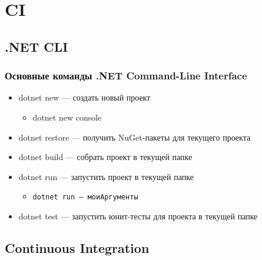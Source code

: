 \documentclass{../../slides-style}
\begin{document}
    \begin{frame}[plain]
        \titlepage
    \end{frame}

    \section{CI}

    \subsection{.NET CLI}

    \begin{frame}
        \frametitle{Основные команды .NET Command-Line Interface}
        \begin{itemize}
            \item dotnet new --- создать новый проект
            \begin{itemize}
                \item dotnet new console
            \end{itemize}
            \item dotnet restore --- получить NuGet-пакеты для текущего проекта
            \item dotnet build --- собрать проект в текущей папке
            \item dotnet run --- запустить проект в текущей папке
            \begin{itemize}
                \item \texttt{dotnet run -- моиАргументы}
            \end{itemize}
            \item dotnet test --- запустить юнит-тесты для проекта в текущей папке
        \end{itemize}
    \end{frame}

    \subsection{Continuous Integration}
\end{document}
